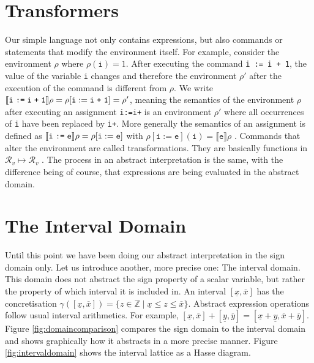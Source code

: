 \section{Transformers}

Our simple language not only contains expressions, but also commands or statements that modify the environment itself. For example, consider the environment $\rho$ where $\rho(\mathtt{i})=1$. After executing the command \texttt{i := i + 1}, the value of the variable \texttt{i} changes and therefore the environment $\rho'$ after the execution of the command is different from $\rho$. We write $\llbracket \texttt{i\;:=\;i\;+\;1} \rrbracket\rho=\rho[\mathtt{i}:=\texttt{i\;+\;1}]=\rho'$, meaning the semantics of the environment $\rho$ after executing an assignment \texttt{i\;:=\;i\;+} is an environment $\rho'$ where all occurrences of \texttt{i} have been replaced by \texttt{i\;+}. 
More generally the semantics of an assignment is defined as $\llbracket \texttt{i\;:=\;e} \rrbracket\rho=\rho[\mathtt{i}:=\texttt{e}]$ with $\rho[\mathtt{i}:=\texttt{e}](\mathtt{i})=\llbracket\mathtt{e}\rrbracket\rho$ \cite{cousot2011}. Commands that alter the environment are called transformations. They are basically functions in $\mathcal{R}_v\mapsto\mathcal{R}_v$ \cite{scott1971}.
The process in an abstract interpretation is the same, with the difference being of course, that expressions are being evaluated in the abstract domain.

\section{The Interval Domain}

Until this point we have been doing our abstract interpretation in the sign domain only. Let us introduce another, more precise one: The interval domain. This domain does not abstract the sign property of a scalar variable, but rather the property of which interval it is included in. An interval $[\underline{x},\overline{x}]$ has the concretisation $\gamma([\underline{x},\overline{x}])=\{z\in\mathbb{Z} \;|\; \underline{x}\leq z \leq \overline{x}\}$. Abstract expression operations follow usual interval arithmetics. For example, $[\underline{x},\overline{x}]+[\underline{y},\overline{y}]=[\underline{x}+\underline{y},\overline{x}+\overline{y}]$. Figure \ref{fig:domaincomparison} compares the sign domain to the interval domain and shows graphically how it abstracts in a more precise manner. Figure \ref{fig:intervaldomain} shows the interval lattice as a Hasse diagram.

